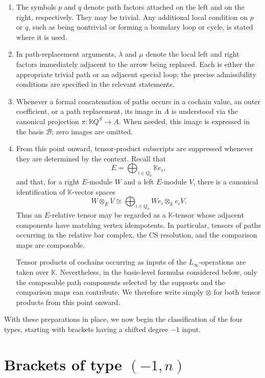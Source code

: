 \documentclass[11pt,a4paper,reqno]{amsart}
\newcommand{\mK}{\mathbb K}
\newcommand{\mB}{\mathcal B}
\theoremstyle{plain}
\theoremstyle{definition}
\numberwithin{equation}{section}
\begin{document}
\begin{enumerate}[label=\textup{(N\arabic*)}]
		\item The symbols $p$ and $q$ denote path factors attached on the left and on
		the right, respectively. They may be trivial. Any additional local condition
		on $p$ or $q$, such as being nontrivial or forming a boundary loop or cycle,
		is stated where it is used.
		
		\item In path-replacement arguments, $\lambda$ and $\mu$ denote the local left
		and right factors immediately adjacent to the arrow being replaced. Each is
		either the appropriate trivial path or an adjacent special loop; the precise
		admissibility conditions are specified in the relevant statements.
		
		\item Whenever a formal concatenation of paths occurs in a cochain value,
		an outer coefficient, or a path replacement, its image in $A$ is understood
		via the canonical projection $\pi:\mK Q^S\to A$. When needed, this image is
		expressed in the basis $\mB$; zero images are omitted.
		
		\item From this point onward, tensor-product subscripts are suppressed whenever
		they are determined by the context. Recall that
		\[
		E=\bigoplus_{i\in Q_0}\mK e_i,
		\]
		and that, for a right $E$-module $W$ and a left $E$-module $V$, there is a
		canonical identification of $\mK$-vector spaces
		\[
		W\otimes_E V
		\cong
		\bigoplus_{i\in Q_0}
		We_i\otimes_{\mK}e_iV.
		\]
		Thus an $E$-relative tensor may be regarded as a $\mK$-tensor whose adjacent
		components have matching vertex idempotents. In particular, tensors of paths
		occurring in the relative bar complex, the CS resolution, and the comparison
		maps are composable.
		
		Tensor products of cochains occurring as inputs of the $L_\infty$-operations
		are taken over $\mK$. Nevertheless, in the basis-level formulas considered
		below, only the composable path components selected by the supports and the
		comparison maps can contribute. We therefore write simply $\otimes$ for both
		tensor products from this point onward.
	\end{enumerate}
	
	With these preparations in place, we now begin the classification of the four
	types, starting with brackets having a shifted degree $-1$ input.
	
	\section{Brackets of type \texorpdfstring{$(-1,n)$}{(-1,n)}}
	\label{sec:degree-minus-one-classification}
	\label{subsec:degree-minus-one}
	
\end{document}

